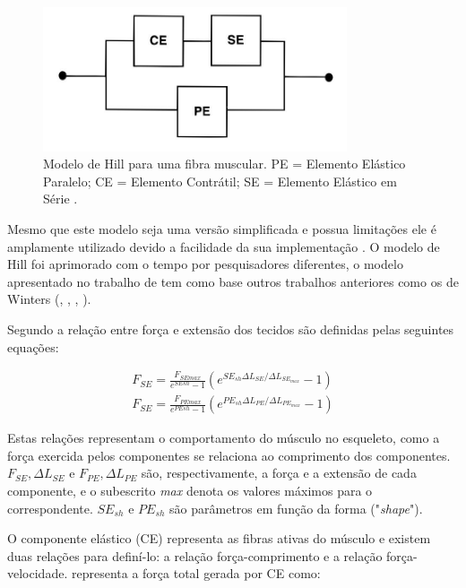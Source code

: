 \begin{figure}[H]
\centering
\includegraphics[width = 0.8\textwidth]{img/Rosen1999.JPG}
\caption[Modelo de Hill para uma fibra muscular]{Modelo de Hill para uma fibra muscular. PE = Elemento Elástico Paralelo; CE = Elemento Contrátil; SE = Elemento Elástico em Série \cite{rosen1999performances}.}
\label{hillmodel}
\end{figure}

Mesmo que este modelo seja uma versão simplificada e possua limitações ele é amplamente utilizado devido a facilidade da sua implementação \cite{rosen1999performances}. O modelo de Hill foi aprimorado com o tempo por pesquisadores diferentes, o modelo apresentado no trabalho de \cite{rosen1999performances} tem como base outros trabalhos anteriores como os de Winters (\cite{winters1993effect}, \cite{winters1985task}, \cite{winters1987biomechanical}, \cite{winters1988estimated}). 

Segundo \cite{rosen1999performances} a relação entre força e extensão dos tecidos são definidas pelas seguintes equações:

\begin{align}
F_{SE}=\frac{F_{SEmax}}{e^{SEsh}-1}(e^{SE_{sh}\Delta L_{SE}/\Delta L_{SE_{max}}}-1) \label{forcaSE} \\
F_{SE}=\frac{F_{PEmax}}{e^{PEsh}-1}(e^{PE_{sh}\Delta L_{PE}/\Delta L_{PE_{max}}}-1) \label{forcaPE}
\end{align}

Estas relações representam o comportamento do músculo no esqueleto, como a força exercida pelos componentes se relaciona ao comprimento dos componentes. $F_{SE}, \Delta L_{SE}$ e $F_{PE},\Delta L_{PE}$ são, respectivamente, a força e a extensão de cada componente, e o subescrito \textit{max} denota os valores máximos para o correspondente. $SE_{sh}$ e $PE_{sh}$ são parâmetros em função da forma ("\textit{shape}").

O componente elástico (CE) representa as fibras ativas do músculo e existem duas relações para definí-lo: a relação força-comprimento e a relação força-velocidade. \cite{rosen1999performances} representa a força total gerada por CE como:

